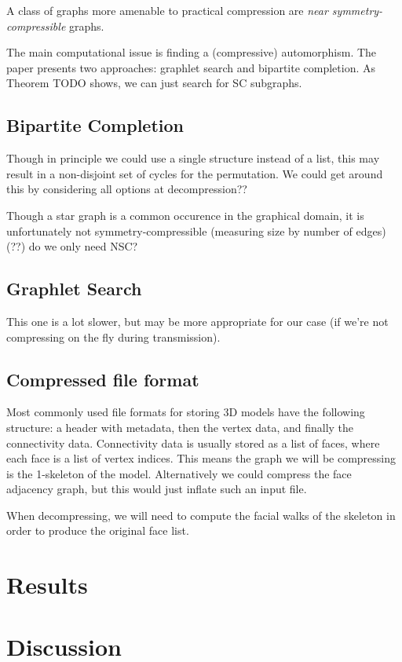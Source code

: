 \documentclass{egpubl}
\begin{document}
A class of graphs more amenable to practical compression are \textit{near symmetry-compressible} graphs. 


The main computational issue is finding a (compressive) automorphism. The paper presents two approaches: graphlet search and bipartite completion.
As Theorem TODO shows, we can just search for SC subgraphs.

\subsection{Bipartite Completion}

Though in principle we could use a single structure instead of a list, this may result in a non-disjoint set of cycles for the permutation. We could get around this by considering all options at decompression??

Though a star graph is a common occurence in the graphical domain, it is unfortunately not symmetry-compressible (measuring size by number of edges) (??) do we only need NSC?

\subsection{Graphlet Search}
This one is a lot slower, but may be more appropriate for our case (if we're not compressing on the fly during transmission).

\subsection{Compressed file format}
Most commonly used file formats for storing 3D models have the following structure: a header with metadata, then the vertex data, and finally the connectivity data. Connectivity data is usually stored as a list of faces, where each face is a list of vertex indices. This means the graph we will be compressing is the 1-skeleton of the model. Alternatively we could compress the face adjacency graph, but this would just inflate such an input file.

When decompressing, we will need to compute the facial walks of the skeleton in order to produce the original face list.

\section{Results}


\section{Discussion}
\end{document}
